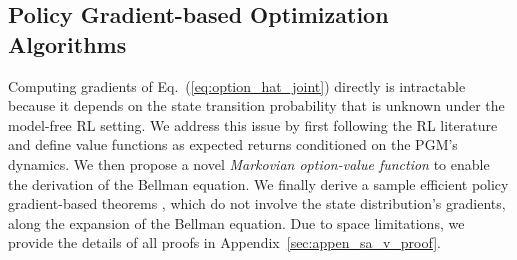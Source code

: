 \documentclass{article}
\begin{document}
\vspace{-3mm}
\subsection{Policy Gradient-based Optimization Algorithms}
\label{sec:pgm_opt}
\vspace{-2mm}

Computing gradients of
Eq.~(\ref{eq:option_hat_joint}) directly is intractable because it
depends on the state transition probability that is unknown under
the model-free RL setting. We address this issue
by first following the RL literature
\cite{sutton2018reinforcement} and define value functions as
expected returns conditioned on the PGM's dynamics. We then
propose a novel \emph{Markovian option-value function} to enable
the derivation of the Bellman equation. We finally derive a
sample efficient policy gradient-based theorems
\cite{sutton2018reinforcement}, which do not involve the state
distribution's gradients, along the expansion of the Bellman
equation. Due to space limitations, we provide the details of all proofs in Appendix~\ref{sec:appen_sa_v_proof}.
\end{document}
